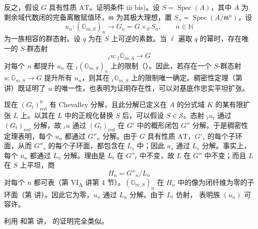 反之，假设 \(G\) 具有性质 \(\mathrm{AT}\)。证明条件  \textup{iii bis)}。设 \(S=\operatorname{Spec}(A)\)，其中 \(A\) 为剩余域代数闭的完备离散赋值环，\(\mathfrak m\) 为其极大理想，置 \(S_n=\operatorname{Spec}(A/\mathfrak m^n)\)，设
\[
 u_n:(\mathbb G_{m,S})_n\longrightarrow
 G_n=G\times_S S_n,\qquad n\in\mathbb N
\]
为一族相容的群态射。设 \(q\) 为在 \(S\) 上可逆的素数。当 \(\ell\) 遍取 \(q\) 的幂时，存在唯一的 \(S\)-群态射
\[
 {}_\ell u:{}_\ell\mathbb G_{m,S}\longrightarrow G
\]
对每个 \(n\) 都提升 \(u_n\) 在 \({}_\ell(\mathbb G_{m,S})_n\) 上的限制（）。因此，若存在一个 \(S\)-群态射 \(u:\mathbb G_{m,S}\to G\) 提升所有 \(u_n\)，则其在 \({}_\ell\mathbb G_{m,S}\) 上的限制唯一确定。稠密性定理（第  讲）既证明了 \(u\) 的唯一性，也表明为证明存在性，可以对基底作忠实平坦扩张。

现在 \((G_t)^0_{\mathrm{red}}\) 有 Chevalley 分解，且此分解已定义在 \(A\) 的分式域 \(K\) 的某有限扩张 \(L\) 上。以其在 \(L\) 中的正规化替换 \(S\) 后，可以假设 \(S\in\mathcal S\)。态射 \({}_\ell u_t\) 通过 \((G_t)_{\mathrm{red}}\) 分解，故 \({}_\ell u\) 通过 \((G_t)_{\mathrm{red}}\) 在 \(G'\) 中的概形闭包 \(G''\) 分解。于是稠密性定理表明，每个 \(u_n\) 都通过 \(G''_n\) 分解。由于 \(G\) 具有性质 \(\mathrm{AT}\)，\(G'_s\) 的每个子环面，从而 \(G''_s\) 的每个子环面，都包含在 \(L_s\) 中；因此 \(u_s\) 通过 \(L_s\) 分解。事实上，每个 \(u_n\) 都通过 \(L_n\) 分解。理由是 \(L_t\) 在 \(G''_t\) 中不变，故 \(L\) 在 \(G''\) 中不变；而且 \(L\) 在 \(S\) 上平坦，商
\[
  H_n=G''_n/L_n
\]
对每个 \(n\) 都可表（第 VI\textsubscript{A} 讲第 4 节）。\((\mathbb G_{m,S})_n\) 在 \(H_n\) 中的像为闭纤维为零的子环面（第  讲）。因此它为零，\(u_n\) 通过 \(L_n\) 分解。由于 \(L_t\) 仿射， 表明族 \((u_n)\) 可容许。

利用 和第  讲， 的证明完全类似。


